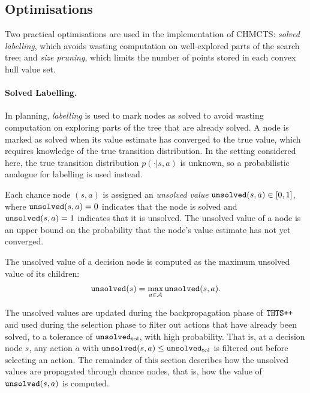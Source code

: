 \subsection{Optimisations}
\label{sec:5-3-6-optimisations}

    Two practical optimisations are used in the implementation of CHMCTS: \textit{solved labelling}, which avoids wasting computation on well-explored parts of the search tree; and \textit{size pruning}, which limits the number of points stored in each convex hull value set.

\paragraph{Solved Labelling.}

    In planning, \textit{labelling} \cite{lrtdp} is used to mark nodes as solved to avoid wasting computation on exploring parts of the tree that are already solved. A node is marked as solved when its value estimate has converged to the true value, which requires knowledge of the true transition distribution. In the setting considered here, the true transition distribution $p(\cdot|s,a)$ is unknown, so a probabilistic analogue for labelling is used instead.


    Each chance node $(s,a)$ is assigned an \textit{unsolved value} ${\textnormal{\texttt{unsolved}}}(s,a)\in[0,1]$, where ${\textnormal{\texttt{unsolved}}}(s,a)=0$ indicates that the node is solved and ${\textnormal{\texttt{unsolved}}}(s,a)=1$ indicates that it is unsolved. The unsolved value of a node is an upper bound on the probability that the node's value estimate has not yet converged.

    The unsolved value of a decision node is computed as the maximum unsolved value of its children:
    \begin{align}
        {\textnormal{\texttt{unsolved}}}(s) = \max_{a\in\mathcal{A}} {\textnormal{\texttt{unsolved}}}(s,a).
    \end{align}

    The unsolved values are updated during the backpropagation phase of ${\textnormal{\texttt{THTS++}}}$ and used during the selection phase to filter out actions that have already been solved, to a tolerance of ${\textnormal{\texttt{unsolved}}_{\textnormal{tol}}}$, with high probability. That is, at a decision node $s$, any action $a$ with ${\textnormal{\texttt{unsolved}}}(s,a) \leq {\textnormal{\texttt{unsolved}}_{\textnormal{tol}}}$ is filtered out before selecting an action. The remainder of this section describes how the unsolved values are propagated through chance nodes, that is, how the value of ${\textnormal{\texttt{unsolved}}}(s,a)$ is computed.



